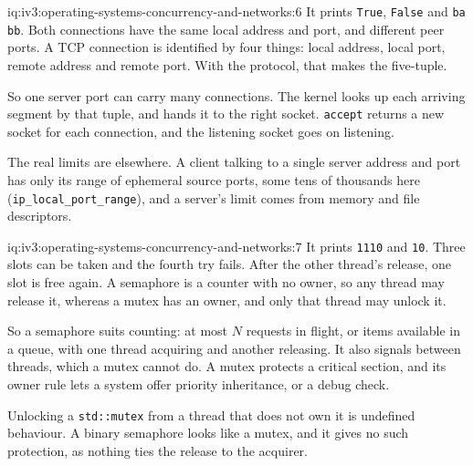 \begin{solution}{iq:iv3:operating-systems-concurrency-and-networks:6}
It prints \texttt{True}, \texttt{False} and \texttt{b\textquotesingle{}a\textquotesingle{} b\textquotesingle{}b\textquotesingle{}}. Both connections have the same local address and port, and different peer ports. A TCP connection is identified by four things: local address, local port, remote address and remote port. With the protocol, that makes the five-tuple.

So one server port can carry many connections. The kernel looks up each arriving segment by that tuple, and hands it to the right socket. \texttt{accept} returns a new socket for each connection, and the listening socket goes on listening.

The real limits are elsewhere. A client talking to a single server address and port has only its range of ephemeral source ports, some tens of thousands here (\texttt{ip\_local\_port\_range}), and a server's limit comes from memory and file descriptors.

\end{solution}

\begin{solution}{iq:iv3:operating-systems-concurrency-and-networks:7}
It prints \texttt{1110} and \texttt{10}. Three slots can be taken and the fourth try fails. After the other thread's release, one slot is free again. A semaphore is a counter with no owner, so any thread may release it, whereas a mutex has an owner, and only that thread may unlock it.

So a semaphore suits counting: at most $N$ requests in flight, or items available in a queue, with one thread acquiring and another releasing. It also signals between threads, which a mutex cannot do. A mutex protects a critical section, and its owner rule lets a system offer priority inheritance, or a debug check.

Unlocking a \texttt{std::mutex} from a thread that does not own it is undefined behaviour. A binary semaphore looks like a mutex, and it gives no such protection, as nothing ties the release to the acquirer.

\end{solution}


